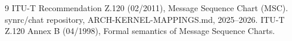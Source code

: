 \documentclass{article}
\begin{document}

\begin{thebibliography}{9}
 ITU-T Recommendation Z.120 (02/2011), Message Sequence Chart (MSC).
 synrc/chat repository, ARCH-KERNEL-MAPPINGS.md, 2025--2026.
 ITU-T Z.120 Annex B (04/1998), Formal semantics of Message Sequence Charts.
\end{thebibliography}
\end{document}
